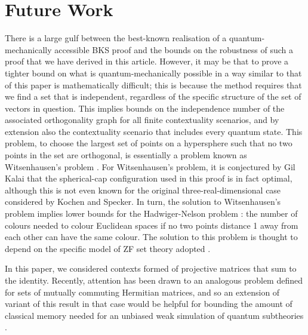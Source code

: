 \documentclass{amsart}
\theoremstyle{definition}
\begin{document}
\section{Future Work}
There is a large gulf between the best-known realisation of a quantum-mechanically accessible BKS proof and the bounds on the robustness of such a proof that we have derived in this article. However, it may be that to prove a tighter bound on what is quantum-mechanically possible in a way similar to that of this paper is mathematically difficult; this is because the method requires that we find a set that is independent, regardless of the specific structure of the set of vectors in question. This implies bounds on the independence number of the associated orthogonality graph for all finite contextuality scenarios, and by extension also the contextuality scenario that includes every quantum state. This problem, to choose the largest set of points on a hypersphere such that no two points in the set are orthogonal, is essentially a problem known as Witsenhausen's problem \cite{Wits1974}. For Witsenhausen's problem, it is conjectured \cite{DeCo2015} by Gil Kalai that the spherical-cap configuration used in this proof is in fact optimal, although this is not even known for the original three-real-dimensional case considered by Kochen and Specker. In turn, the solution to Witsenhausen's problem implies lower bounds for the Hadwiger-Nelson problem \cite{DeCo2015}: the number of colours needed to colour Euclidean spaces if no two points distance 1 away from each other can have the same colour. The solution to this problem is thought to depend on the specific model of ZF set theory adopted \cite{Soif2008}.

 In this paper, we considered contexts formed of projective matrices that sum to the identity. Recently, attention has been drawn to an analogous problem defined for sets of mutually commuting Hermitian matrices, and so an extension of variant of this result in that case would be helpful for bounding the amount of classical memory needed for an unbiased weak simulation of quantum subtheories \cite{Kara2017}. %
\end{document}
